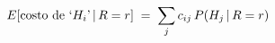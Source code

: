 \documentclass[preview]{standalone}
\begin{document}
\begin{align*}
\special{dvisvgm:raw <g id='unique000'>}E[\text{costo de `}H_i\text{'}\,|\,R=r]\;=\;\sum_j c_{ij}\,P(H_j\,|\,R=r)\special{dvisvgm:raw </g>}
\end{align*}
\end{document}

